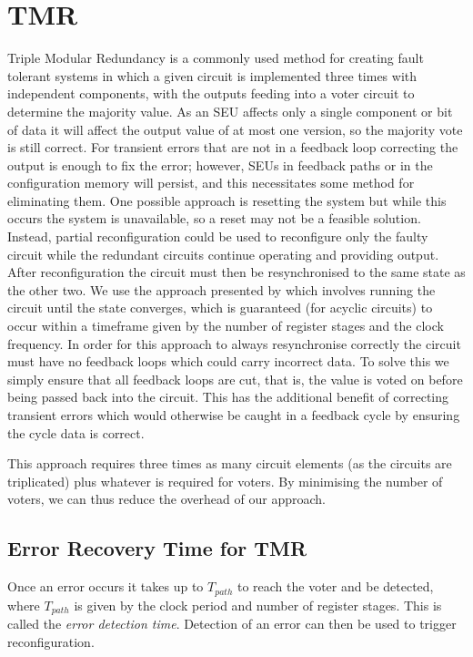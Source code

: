 \documentclass[12pt,final,oneside]{dwThesis} %
\begin{document}
   \section{\gls{TMR}
   }\label{secTMR} Triple Modular Redundancy is a
   commonly used method for creating fault tolerant systems in which a given
   circuit is implemented three times with independent components, with the
   outputs feeding into a voter circuit to determine the majority value. As an
   \gls{SEU} affects only a single component or bit of data it
   will affect the output value of at most one version, so the majority vote is
   still correct. For transient errors that are not in a feedback loop correcting
   the output is enough to fix the error; however, \glspl{SEU} in feedback paths
   or in the configuration memory will persist, and this necessitates some method
   for eliminating them. One possible approach is resetting the system but while
   this occurs the system is unavailable, so a reset may not be a feasible
   solution. Instead, partial reconfiguration could be used to reconfigure only
   the faulty circuit while the redundant circuits continue operating and
   providing output. After reconfiguration the circuit must then be resynchronised
   to the same state as the other two. We use the approach presented by
   \cite{DiesselChange} which involves running the circuit until the state
   converges, which is guaranteed (for acyclic circuits) to occur within a
   timeframe given by the number of register stages and the clock frequency. In
   order for this approach to always resynchronise correctly the circuit must have
   no feedback loops which could carry incorrect data. To solve this we simply
   ensure that all feedback loops are \gls{cut}, that is, the value is voted on
   before being passed back into the circuit. This has the additional benefit of
   correcting transient errors which would otherwise be caught in a feedback cycle
   by ensuring the cycle data is correct.

   This approach requires three times as many circuit elements (as the circuits
   are triplicated) plus whatever is required for voters. By minimising the
   number of voters, we can thus reduce the overhead of our approach.

   \subsection{Error Recovery Time for \gls{TMR}}

   Once an error occurs it takes up to $T_{path}$ to reach the voter and be
   detected, where $T_{path}$ is given by the clock period and number of
   register stages. This is called the \textit{error detection time}. Detection
   of an error can then be used to trigger reconfiguration.
\end{document}
